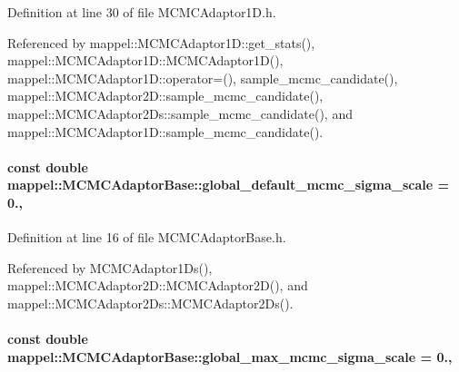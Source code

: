Definition at line 30 of file M\+C\+M\+C\+Adaptor1\+D.\+h.



Referenced by mappel\+::\+M\+C\+M\+C\+Adaptor1\+D\+::get\+\_\+stats(), mappel\+::\+M\+C\+M\+C\+Adaptor1\+D\+::\+M\+C\+M\+C\+Adaptor1\+D(), mappel\+::\+M\+C\+M\+C\+Adaptor1\+D\+::operator=(), sample\+\_\+mcmc\+\_\+candidate(), mappel\+::\+M\+C\+M\+C\+Adaptor2\+D\+::sample\+\_\+mcmc\+\_\+candidate(), mappel\+::\+M\+C\+M\+C\+Adaptor2\+Ds\+::sample\+\_\+mcmc\+\_\+candidate(), and mappel\+::\+M\+C\+M\+C\+Adaptor1\+D\+::sample\+\_\+mcmc\+\_\+candidate().

\paragraph[{\texorpdfstring{global\+\_\+default\+\_\+mcmc\+\_\+sigma\+\_\+scale}{global_default_mcmc_sigma_scale}}]{\setlength{\rightskip}{0pt plus 5cm}const double mappel\+::\+M\+C\+M\+C\+Adaptor\+Base\+::global\+\_\+default\+\_\+mcmc\+\_\+sigma\+\_\+scale = 0.\hspace{0.3cm}{\ttfamily [static]}, {\ttfamily [inherited]}}\hypertarget{classmappel_1_1MCMCAdaptorBase_a44cebca0e27135c854fa8430d2d89929}{}\label{classmappel_1_1MCMCAdaptorBase_a44cebca0e27135c854fa8430d2d89929}


Definition at line 16 of file M\+C\+M\+C\+Adaptor\+Base.\+h.



Referenced by M\+C\+M\+C\+Adaptor1\+Ds(), mappel\+::\+M\+C\+M\+C\+Adaptor2\+D\+::\+M\+C\+M\+C\+Adaptor2\+D(), and mappel\+::\+M\+C\+M\+C\+Adaptor2\+Ds\+::\+M\+C\+M\+C\+Adaptor2\+Ds().

\paragraph[{\texorpdfstring{global\+\_\+max\+\_\+mcmc\+\_\+sigma\+\_\+scale}{global_max_mcmc_sigma_scale}}]{\setlength{\rightskip}{0pt plus 5cm}const double mappel\+::\+M\+C\+M\+C\+Adaptor\+Base\+::global\+\_\+max\+\_\+mcmc\+\_\+sigma\+\_\+scale = 0.\hspace{0.3cm}{\ttfamily [static]}, {\ttfamily [inherited]}}\hypertarget{classmappel_1_1MCMCAdaptorBase_aebc93881ca351e67de867238a62579eb}{}\label{classmappel_1_1MCMCAdaptorBase_aebc93881ca351e67de867238a62579eb}


